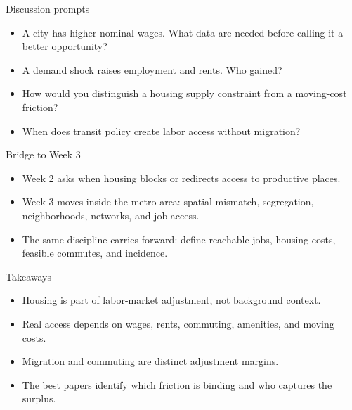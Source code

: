 \documentclass[aspectratio=169,11pt]{beamer}
\begin{document}
\begin{frame}{Discussion prompts}
\begin{itemize}
    \item A city has higher nominal wages. What data are needed before calling it a better opportunity?
    \item A demand shock raises employment and rents. Who gained?
    \item How would you distinguish a housing supply constraint from a moving-cost friction?
    \item When does transit policy create labor access without migration?
\end{itemize}
\end{frame}

\begin{frame}{Bridge to Week 3}
\begin{itemize}
    \item Week 2 asks when housing blocks or redirects access to productive places.
    \item Week 3 moves inside the metro area: spatial mismatch, segregation, neighborhoods, networks, and job access.
    \item The same discipline carries forward: define reachable jobs, housing costs, feasible commutes, and incidence.
\end{itemize}
\end{frame}

\begin{frame}{Takeaways}
\begin{itemize}
    \item Housing is part of labor-market adjustment, not background context.
    \item Real access depends on wages, rents, commuting, amenities, and moving costs.
    \item Migration and commuting are distinct adjustment margins.
    \item The best papers identify which friction is binding and who captures the surplus.
\end{itemize}
\end{frame}
\end{document}

